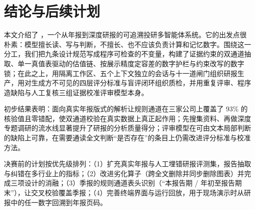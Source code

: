 \section{结论与后续计划}
\label{sec:conclusion}

本文介绍了 \sysname{}，一个从年报到深度研报的可追溯投研多智能体系统。它的出发点很朴素：模型擅长读、写与判断，不擅长、也不应该负责计算和记忆数字。围绕这一分工，我们把九条设计规范写成程序可检查的不变量，构建了证据约束的双通道抽取、单一真值表驱动的估值链、按展示精度定容差的数字护栏与约束改写的数字锁；在此之上，用隔离工作区、五个上下文独立的会话与十一道闸门组织研报生产，用对生成方不可见的四层评分标准与盲评闭环组织质检，并用重复评审、程序造缺陷与人工复核三组证据校准评审模型本身。

初步结果表明：面向真实年报版式的解析让规则通道在三家公司上覆盖了 93\% 的核验值且零错配，使双通道校验在真实数据上真正起作用；先搜集资料、再做深度专题调研的流水线显著提升了研报的分析质量得分；评审模型在可由文本局部判断的缺陷上可靠，在需要通读全文判断“是否存在”的条目上仍需改进评分标准与校准方法。

决赛前的计划按优先级排列：（1）扩充真实年报与人工埋错研报评测集，报告抽取与纠错在多行业上的指标；（2）改进劣化算子（跨全文删除并同步删除图表）并完成三项设计的消融；（3）季报的规则通道表头识别（“本报告期 / 年初至报告期末”），让交叉校验覆盖季报；（4）完善终端界面与运行回放，用于现场演示时从研报中的任一数字回溯到年报页码。
